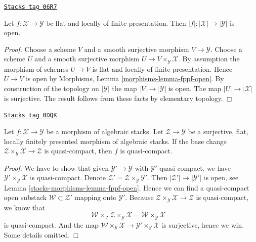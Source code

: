 \begin{lemma}
\label{stacks-morphisms-lemma-fppf-open}
\href{https://stacks.math.columbia.edu/tag/06R7}{\texttt{Stacks tag 06R7}}

Let $f : \mathcal{X} \to \mathcal{Y}$ be flat and locally of finite
presentation. Then $|f| : |\mathcal{X}| \to |\mathcal{Y}|$ is open.
\end{lemma}

\begin{proof}
Choose a scheme $V$ and a smooth surjective morphism $V \to \mathcal{Y}$.
Choose a scheme $U$ and a smooth surjective morphism
$U \to V \times_\mathcal{Y} \mathcal{X}$. By assumption the morphism
of schemes $U \to V$ is flat and locally of finite presentation.
Hence $U \to V$ is open by
Morphisms, Lemma \ref{morphisms-lemma-fppf-open}.
By construction of the topology on $|\mathcal{Y}|$ the map
$|V| \to |\mathcal{Y}|$ is open.
The map $|U| \to |\mathcal{X}|$ is surjective.
The result follows from these facts by elementary topology.
\end{proof}

\begin{lemma}
\label{stacks-morphisms-lemma-descent-quasi-compact}
\href{https://stacks.math.columbia.edu/tag/0DQK}{\texttt{Stacks tag 0DQK}}

Let $f : \mathcal{X} \to \mathcal{Y}$ be a morphism of algebraic stacks.
Let $\mathcal{Z} \to \mathcal{Y}$ be a surjective, flat, locally finitely
presented morphism of algebraic stacks. If the base change
$\mathcal{Z} \times_\mathcal{Y} \mathcal{X} \to \mathcal{Z}$
is quasi-compact, then $f$ is quasi-compact.
\end{lemma}

\begin{proof}
We have to show that given $\mathcal{Y}' \to \mathcal{Y}$
with $\mathcal{Y}'$ quasi-compact, we have
$\mathcal{Y}' \times_\mathcal{Y} \mathcal{X}$ is quasi-compact.
Denote $\mathcal{Z}' = \mathcal{Z} \times_\mathcal{Y} \mathcal{Y}'$.
Then $|\mathcal{Z}'| \to |\mathcal{Y}'|$ is open, see
Lemma \ref{stacks-morphisms-lemma-fppf-open}. Hence we can find a quasi-compact
open substack $\mathcal{W} \subset \mathcal{Z}'$ mapping onto
$\mathcal{Y}'$. Because
$\mathcal{Z} \times_\mathcal{Y} \mathcal{X} \to \mathcal{Z}$
is quasi-compact, we know that
$$
\mathcal{W} \times_\mathcal{Z} \mathcal{Z} \times_\mathcal{Y} \mathcal{X} =
\mathcal{W} \times_\mathcal{Y} \mathcal{X}
$$
is quasi-compact. And the map
$\mathcal{W} \times_\mathcal{Y} \mathcal{X} \to
\mathcal{Y}' \times_\mathcal{Y} \mathcal{X}$
is surjective, hence we win. Some details omitted.
\end{proof}

